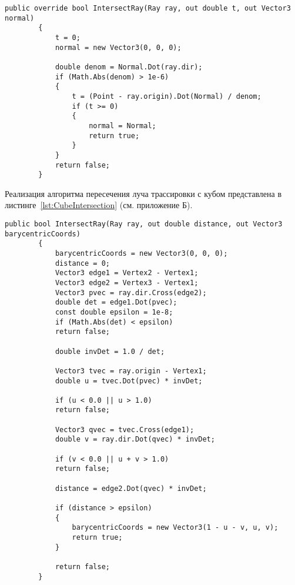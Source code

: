 \clearpage
\begin{center}
	\begin{lstlisting}[linewidth=\linewidth, label={lst:WallIntersection}, captionpos={t}, caption={Алгоритм поиска точки пересечения луча с плоскостью (стеной)}]
		public override bool IntersectRay(Ray ray, out double t, out Vector3 normal)
		{
			t = 0;
			normal = new Vector3(0, 0, 0);
			
			double denom = Normal.Dot(ray.dir);
			if (Math.Abs(denom) > 1e-6)
			{
				t = (Point - ray.origin).Dot(Normal) / denom;
				if (t >= 0)
				{
					normal = Normal;
					return true;
				}
			}
			return false;
		}
	\end{lstlisting}
\end{center}

Реализация алгоритма пересечения луча трассировки с кубом представлена в листинге~\ref{lst:CubeIntersection} (см. приложение Б).

\clearpage
\begin{center}
	\begin{lstlisting}[linewidth=\linewidth, label={lst:TriangleIntersection}, captionpos={t}, caption={Алгоритм поиска точки пересечения луча с треугольным полигоном}]
		public bool IntersectRay(Ray ray, out double distance, out Vector3 barycentricCoords)
		{
			barycentricCoords = new Vector3(0, 0, 0);
			distance = 0;
			Vector3 edge1 = Vertex2 - Vertex1;
			Vector3 edge2 = Vertex3 - Vertex1;
			Vector3 pvec = ray.dir.Cross(edge2);
			double det = edge1.Dot(pvec);
			const double epsilon = 1e-8;
			if (Math.Abs(det) < epsilon)
			return false;
			
			double invDet = 1.0 / det;
			
			Vector3 tvec = ray.origin - Vertex1;
			double u = tvec.Dot(pvec) * invDet;
			
			if (u < 0.0 || u > 1.0)
			return false;
			
			Vector3 qvec = tvec.Cross(edge1);
			double v = ray.dir.Dot(qvec) * invDet;
			
			if (v < 0.0 || u + v > 1.0)
			return false;
			
			distance = edge2.Dot(qvec) * invDet;
			
			if (distance > epsilon)
			{
				barycentricCoords = new Vector3(1 - u - v, u, v);
				return true;
			}
			
			return false;
		}
	\end{lstlisting}
\end{center}


